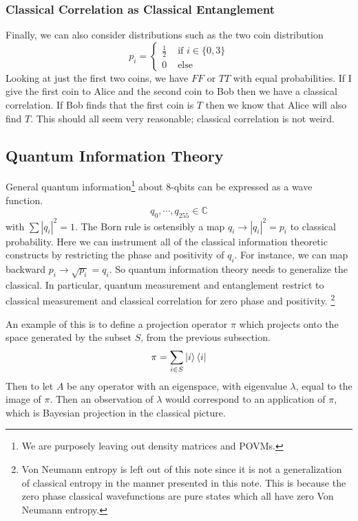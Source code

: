 \documentclass[12pt,a4paper]{article}
\begin{document}
\subsubsection{Classical Correlation as Classical Entanglement}
Finally, we can also consider distributions such as the two coin distribution
\[
p_i = 
\left\{
\begin{split}
\frac{1}{2} & \mbox{ if } i \in \{0,3\}\\
0 &\mbox{ else }
\end{split}
\right.
\]
Looking at just the first two coins, we have $FF$ or $TT$ with equal probabilities.  If I give the first coin to Alice and the second coin to Bob then we have a classical correlation.  If Bob finds that the first coin is $T$ then we know that Alice will also find $T$.  This should all seem very reasonable; classical correlation is not weird.

\subsection{Quantum Information Theory}
General quantum information\footnote{We are purposely leaving out density matrices and POVMs.} about 8-qbits can be expressed as a wave function.
\[
   q_0,\cdots,q_{255} \in \mathbb{C}
\]
with $\sum |q_i|^2 = 1$.  The Born rule is ostensibly a map $q_i \rightarrow |q_i|^2 = p_i$ to classical probability.  Here we can instrument all of the classical information theoretic constructs by restricting the phase and positivity of $q_i$.  For instance, we can map backward $p_i \rightarrow \sqrt{p_i} = q_i$.  So quantum information theory needs to generalize the classical.  In particular, quantum measurement and entanglement restrict to classical measurement and classical correlation for zero phase and positivity. \footnote{Von Neumann entropy is left out of this note since it is not a generalization of classical entropy in the manner presented in this note.  This is because the zero phase classical wavefunctions are pure states which all have zero Von Neumann entropy.}

An example of this is to define a projection operator $\pi$ which projects onto the space generated by the subset $S$, from the previous subsection.
\[
\pi = \sum_{i \in S} \ket{i} \bra{i}
\]
Then to let $A$ be any operator with an eigenspace, with eigenvalue $\lambda$, equal to the image of $\pi$.  Then an observation of $\lambda$ would correspond to an application of $\pi$, which is Bayesian projection in the classical picture.
\end{document}

